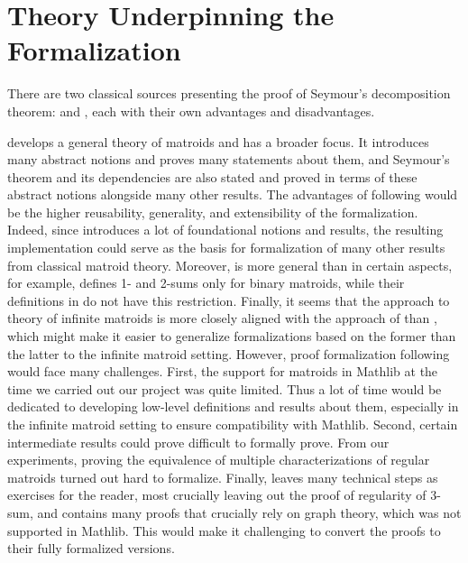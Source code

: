 \section{Theory Underpinning the Formalization}

There are two classical sources presenting the proof of Seymour's decomposition theorem: \cite{Oxley2011} and \cite{Truemper2016}, each with their own advantages and disadvantages.

\citeauthor{Oxley2011} \cite{Oxley2011} develops a general theory of matroids and has a broader focus. It introduces many abstract notions and proves many statements about them, and Seymour's theorem and its dependencies are also stated and proved in terms of these abstract notions alongside many other results. The advantages of following \cite{Oxley2011} would be the higher reusability, generality, and extensibility of the formalization. Indeed, since \cite{Oxley2011} introduces a lot of foundational notions and results, the resulting implementation could serve as the basis for formalization of many other results from classical matroid theory. Moreover, \cite{Oxley2011} is more general than \cite{Truemper2016} in certain aspects, for example, \cite{Truemper2016} defines 1- and 2-sums only for binary matroids, while their definitions in \cite{Oxley2011} do not have this restriction. Finally, it seems that the approach to theory of infinite matroids \cite{Bruhn2013} is more closely aligned with the approach of \cite{Oxley2011} than \cite{Truemper2016}, which might make it easier to generalize formalizations based on the former than the latter to the infinite matroid setting. However, proof formalization following \cite{Oxley2011} would face many challenges. First, the support for matroids in Mathlib at the time we carried out our project was quite limited. Thus a lot of time would be dedicated to developing low-level definitions and results about them, especially in the infinite matroid setting to ensure compatibility with Mathlib. Second, certain intermediate results could prove difficult to formally prove. From our experiments, proving the equivalence of multiple characterizations of regular matroids turned out hard to formalize. Finally, \cite{Oxley2011} leaves many technical steps as exercises for the reader, most crucially leaving out the proof of regularity of 3-sum, and contains many proofs that crucially rely on graph theory, which was not supported in Mathlib. This would make it challenging to convert the proofs to their fully formalized versions.

